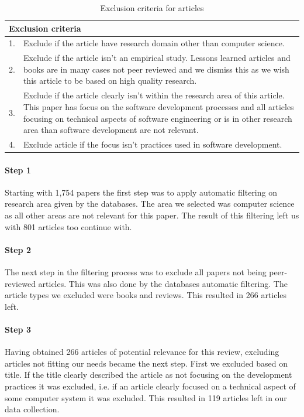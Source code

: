 \documentclass[12pt]{article}
\begin{document}
\begin{table}[h!]
	\begin{center}
		\caption{Exclusion criteria for articles}
		\label{table:datacriteria}
		\begin{tabular}{l p{}}
		 	\multicolumn{2}{l}{Exclusion criteria}\\
		 	\hline
			1. & Exclude if the article have research domain other than computer science. \\
			2. & Exclude if the article isn't an empirical study. Lessons learned articles and books are in many cases not peer reviewed and we dismiss this as we wish this article to be based on high quality research. \\
			3. & Exclude if the article clearly isn't within the research area of this article. This paper has focus on the software development processes and all articles focusing on technical aspects of software engineering or is in other research area than software development are not relevant. \\
			4. & Exclude article if the focus isn't practices used in software development. \\
		\end{tabular}
	\end{center}
\end{table}

\paragraph{Step 1}
Starting with 1,754 papers the first step was to apply automatic filtering on research area given by the databases. The area we selected was computer science as all other areas are not relevant for this paper. The result of this filtering left us with 801 articles too continue with. 

\paragraph{Step 2}
The next step in the filtering process was to exclude all papers not being peer-reviewed articles. This was also done by the databases automatic filtering. The article types we excluded were books and reviews. This resulted in 266 articles left. 

\paragraph{Step 3}
Having obtained 266 articles of potential relevance for this review, excluding articles not fitting our needs became the next step. First we excluded based on title. If the title clearly described the article as not focusing on the development practices it was excluded, i.e. if an article clearly focused on a technical aspect of some computer system it was excluded. This resulted in 119 articles left in our data collection. 
\end{document}
